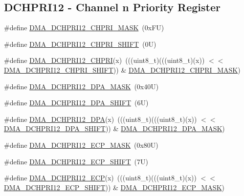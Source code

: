 \subsection*{D\+C\+H\+P\+R\+I12 -\/ Channel n Priority Register}
\begin{DoxyCompactItemize}
\item 
\#define \mbox{\hyperlink{group___d_m_a___register___masks_gae4a41c199e83720c8912622f921f3993}{D\+M\+A\+\_\+\+D\+C\+H\+P\+R\+I12\+\_\+\+C\+H\+P\+R\+I\+\_\+\+M\+A\+SK}}~(0x\+F\+U)
\item 
\#define \mbox{\hyperlink{group___d_m_a___register___masks_ga463e67297f7a0d3b1c7c6799ac90fb15}{D\+M\+A\+\_\+\+D\+C\+H\+P\+R\+I12\+\_\+\+C\+H\+P\+R\+I\+\_\+\+S\+H\+I\+FT}}~(0\+U)
\item 
\#define \mbox{\hyperlink{group___d_m_a___register___masks_ga6ecccb191b6a4cd797b6353bba497f4e}{D\+M\+A\+\_\+\+D\+C\+H\+P\+R\+I12\+\_\+\+C\+H\+P\+RI}}(x)~(((uint8\+\_\+t)(((uint8\+\_\+t)(x)) $<$$<$ \mbox{\hyperlink{group___d_m_a___register___masks_ga463e67297f7a0d3b1c7c6799ac90fb15}{D\+M\+A\+\_\+\+D\+C\+H\+P\+R\+I12\+\_\+\+C\+H\+P\+R\+I\+\_\+\+S\+H\+I\+FT}})) \& \mbox{\hyperlink{group___d_m_a___register___masks_gae4a41c199e83720c8912622f921f3993}{D\+M\+A\+\_\+\+D\+C\+H\+P\+R\+I12\+\_\+\+C\+H\+P\+R\+I\+\_\+\+M\+A\+SK}})
\item 
\#define \mbox{\hyperlink{group___d_m_a___register___masks_ga73ff6289479b47b9e3fd209fb447ef3a}{D\+M\+A\+\_\+\+D\+C\+H\+P\+R\+I12\+\_\+\+D\+P\+A\+\_\+\+M\+A\+SK}}~(0x40\+U)
\item 
\#define \mbox{\hyperlink{group___d_m_a___register___masks_ga2542343fffad88b0445eaa1d2db1e56f}{D\+M\+A\+\_\+\+D\+C\+H\+P\+R\+I12\+\_\+\+D\+P\+A\+\_\+\+S\+H\+I\+FT}}~(6\+U)
\item 
\#define \mbox{\hyperlink{group___d_m_a___register___masks_gafb51b24a96601e63cd3b68afd220a56b}{D\+M\+A\+\_\+\+D\+C\+H\+P\+R\+I12\+\_\+\+D\+PA}}(x)~(((uint8\+\_\+t)(((uint8\+\_\+t)(x)) $<$$<$ \mbox{\hyperlink{group___d_m_a___register___masks_ga2542343fffad88b0445eaa1d2db1e56f}{D\+M\+A\+\_\+\+D\+C\+H\+P\+R\+I12\+\_\+\+D\+P\+A\+\_\+\+S\+H\+I\+FT}})) \& \mbox{\hyperlink{group___d_m_a___register___masks_ga73ff6289479b47b9e3fd209fb447ef3a}{D\+M\+A\+\_\+\+D\+C\+H\+P\+R\+I12\+\_\+\+D\+P\+A\+\_\+\+M\+A\+SK}})
\item 
\#define \mbox{\hyperlink{group___d_m_a___register___masks_ga6670cd9c6c3dba8c53f330f44c6ca328}{D\+M\+A\+\_\+\+D\+C\+H\+P\+R\+I12\+\_\+\+E\+C\+P\+\_\+\+M\+A\+SK}}~(0x80\+U)
\item 
\#define \mbox{\hyperlink{group___d_m_a___register___masks_ga5331565714ddd597bad4518d1c5317e4}{D\+M\+A\+\_\+\+D\+C\+H\+P\+R\+I12\+\_\+\+E\+C\+P\+\_\+\+S\+H\+I\+FT}}~(7\+U)
\item 
\#define \mbox{\hyperlink{group___d_m_a___register___masks_ga1805981671d3a4803d8109f15c726bea}{D\+M\+A\+\_\+\+D\+C\+H\+P\+R\+I12\+\_\+\+E\+CP}}(x)~(((uint8\+\_\+t)(((uint8\+\_\+t)(x)) $<$$<$ \mbox{\hyperlink{group___d_m_a___register___masks_ga5331565714ddd597bad4518d1c5317e4}{D\+M\+A\+\_\+\+D\+C\+H\+P\+R\+I12\+\_\+\+E\+C\+P\+\_\+\+S\+H\+I\+FT}})) \& \mbox{\hyperlink{group___d_m_a___register___masks_ga6670cd9c6c3dba8c53f330f44c6ca328}{D\+M\+A\+\_\+\+D\+C\+H\+P\+R\+I12\+\_\+\+E\+C\+P\+\_\+\+M\+A\+SK}})
\end{DoxyCompactItemize}
